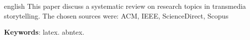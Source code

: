 \documentclass[
article,			%
11pt,				%
oneside,			%
a4paper,			%
english,			%
brazil,				%
sumario=tradicional
]{abntex2}
\begin{document}
  \postextual



  \emptythanks
  \maketitle

  \renewcommand{\resumoname}{Abstract}
  \begin{resumoumacoluna}
    \begin{otherlanguage*}{english}
      This paper discuss a systematic review on research topics in transmedia storytelling. The chosen sources were: ACM, IEEE, ScienceDirect, Scopus

      \vspace{\onelineskip}

      \noindent
      \textbf{Keywords}: latex. abntex.
    \end{otherlanguage*}
  \end{resumoumacoluna}


  
\end{document}
